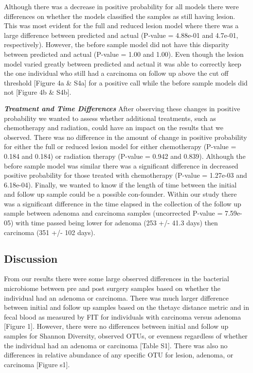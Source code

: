 \documentclass[12pt,]{article}
\begin{document}
Although there was a decrease in positive probability for all models
there were differences on whether the models classified the samples as
still having lesion. This was most evident for the full and reduced
lesion model where there was a large difference between predicted and
actual (P-value = 4.88e-01 and 4.7e-01, respectively). However, the
before sample model did not have this disparity between predicted and
actual (P-value = 1.00 and 1.00). Even though the lesion model varied
greatly between predicted and actual it was able to correctly keep the
one individual who still had a carcinoma on follow up above the cut off
threshold {[}Figure 4a \& S4a{]} for a positive call while the before
sample models did not {[}Figure 4b \& S4b{]}.

\textbf{\emph{Treatment and Time Differences}} After observing these
changes in positive probability we wanted to assess whether additional
treatments, such as chemotherapy and radiation, could have an impact on
the results that we observed. There was no difference in the amount of
change in positive probability for either the full or reduced lesion
model for either chemotherapy (P-value = 0.184 and 0.184) or radiation
therapy (P-value = 0.942 and 0.839). Although the before sample model
was similar there was a significant difference in decreased positive
probability for those treated with chemotherapy (P-value = 1.27e-03 and
6.18e-04). Finally, we wanted to know if the length of time between the
initial and follow up sample could be a possible con-founder. Within our
study there was a significant difference in the time elapsed in the
collection of the follow up sample between adenoma and carcinoma samples
(uncorrected P-value = 7.59e-05) with time passed being lower for
adenoma (253 +/- 41.3 days) then carcinoma (351 +/- 102 days).

\newpage

\subsection{Discussion}\label{discussion}

From our results there were some large observed differences in the
bacterial microbiome between pre and post surgery samples based on
whether the individual had an adenoma or carcinoma. There was much
larger difference between initial and follow up samples based on the
thetayc distance metric and in fecal blood as measured by FIT for
individuals with carcinoma versus adenoma {[}Figure 1{]}. However, there
were no differences between initial and follow up samples for Shannon
Diversity, observed OTUs, or evenness regardless of whether the
individual had an adenoma or carcinoma {[}Table S1{]}. There was also no
differences in relative abundance of any specific OTU for lesion,
adenoma, or carcinoma {[}Figure s1{]}.
\end{document}
